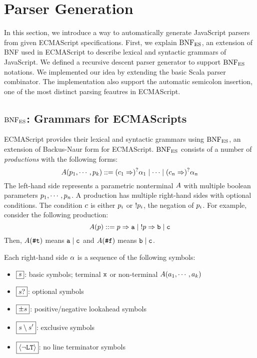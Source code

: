 \section{Parser Generation}

In this section, we introduce a way to automatically generate JavaScript parsers
from given ECMAScript specifications. First, we explain \( \text{BNF}_{\text{ES}} \), an extension
of BNF used in ECMAScript to describe lexical and syntactic grammars of JavaScript.
We defined a recursive descent parser generator to support \( \text{BNF}_{\text{ES}} \) notations.
We implemented our idea by extending the basic Scala parser combinator.
The implementation also support the automatic semicolon insertion,
one of the most distinct parsing feautres in ECMAScript.

\subsection{\( \text{BNF}_{\text{ES}} \): Grammars for ECMAScripts}

ECMAScript provides their lexical and syntactic grammars using \( \text{BNF}_{\text{ES}} \),
an extension of Backus-Naur form for ECMAScript.
\( \text{BNF}_{\text{ES}} \) consists of a number of \textit{productions}
with the following forms:
\[
  A(p_1, \cdots, p_k) ::=
  (c_1 \Rightarrow)^? \alpha_1 \mid
  \cdots \mid
  (c_n \Rightarrow)^? \alpha_n
\]
The left-hand side represents a parametric nonterminal \( A \) with
multiple boolean parameters \( p_1, \cdots, p_n \).
A production has multiple right-hand sides with optional conditions.
The condition \( c \) is either \( p_i \) or \( ! p_i \),
the negation of \( p_i \).
For example, consider the following production:
\[
  A(p) ::= p \Rightarrow \texttt{a}
  \mid \; !p \Rightarrow \texttt{b}
  \mid  \texttt{c}
\]
Then, \( A(\texttt{\#t}) \) means \( \texttt{a} \mid \texttt{c} \)
and \( A(\texttt{\#f}) \) means \( \texttt{b} \mid \texttt{c} \).

Each right-hand side \( \alpha \) is a sequence of the following symbols:
\begin{itemize}
  \item \( \boxed{s} \):
    basic symbols; terminal \( \texttt{x} \) or
    non-terminal \( A(a_1, \cdots, a_k) \)
  \item \( \boxed{s?} \): optional symbols
  \item \( \boxed{\pm s} \): positive/negative lookahead symbols
  \item \( \boxed{s \setminus s'} \): exclusive symbols
  \item \( \boxed{\left<\neg\texttt{LT}\right>} \): no line terminator symbols
\end{itemize}

